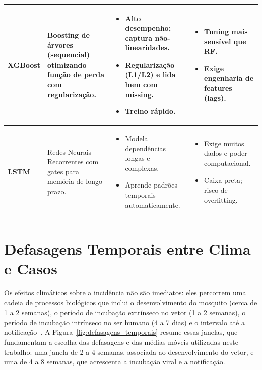 \begin{table}[!ht]
\begin{tabular}{|p{}|p{}|p{}|p{}|}
    \textbf{XGBoost} & Boosting de árvores (sequencial) otimizando função de perda com regularização. & \begin{itemize}[leftmargin=*,noitemsep,topsep=0pt] \item Alto desempenho; captura não-linearidades. \item Regularização (L1/L2) e lida bem com missing. \item Treino rápido. \end{itemize} & \begin{itemize}[leftmargin=*,noitemsep,topsep=0pt] \item Tuning mais sensível que RF. \item Exige engenharia de features (lags). \end{itemize} \\ \hline
    \textbf{LSTM} & Redes Neurais Recorrentes com gates para memória de longo prazo. & \begin{itemize}[leftmargin=*,noitemsep,topsep=0pt] \item Modela dependências longas e complexas. \item Aprende padrões temporais automaticamente. \end{itemize} & \begin{itemize}[leftmargin=*,noitemsep,topsep=0pt] \item Exige muitos dados e poder computacional. \item Caixa-preta; risco de overfitting. \end{itemize} \\ \hline
    \end{tabular}
\end{table}

\section{Defasagens Temporais entre Clima e Casos}
\label{sec:defasagens}

Os efeitos climáticos sobre a incidência não são imediatos: eles percorrem uma cadeia de processos biológicos que inclui o desenvolvimento do mosquito (cerca de 1 a 2 semanas), o período de incubação extrínseco no vetor (1 a 2 semanas), o período de incubação intrínseco no ser humano (4 a 7 dias) e o intervalo até a notificação~\cite{analysis_climate_factors_dengue,health_impact_dengue_precipitation_sp}. A Figura~\ref{fig:defasagens_temporais} resume essas janelas, que fundamentam a escolha das defasagens e das médias móveis utilizadas neste trabalho: uma janela de 2 a 4 semanas, associada ao desenvolvimento do vetor, e uma de 4 a 8 semanas, que acrescenta a incubação viral e a notificação.

